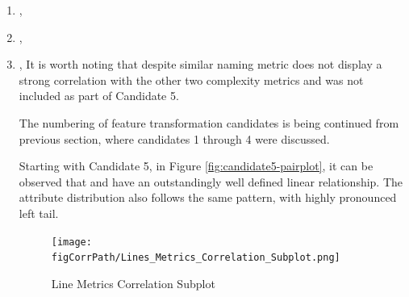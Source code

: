 \begin{enumerate}
\FloatBarrier
\textbf{In conclusion} all features investigated in this section have displayed high positive relationship with one another, very strong linear relationship as well as almost perfectly aligned data distribution. Therefore, only 4 of the 10 attributes, enumerated in section \ref{lst:code-coverage-candidates}, have been retained:

\begin{itemize}
    \item \overallBranchCoverage{}
    \item \overallUncoveredLines{}
    \item \overallCoverage{}
    \item \overallUncoveredConditions{}
\end{itemize}

\paragraph{Line and complexity features}\label{sec:impl-data-analysis:corr:line-and-complexity}
In the following section a number off attributes will be investigated with regards to the possibility of transforming said features and reducing dimensionality of the overall dataset. Given a sub plot of a heatmap presented in Figure \ref{fig:correlation-line-metrics-subplot} the attributes under analysis are, based on their high correlation:
    \item \complexity{}, \fileComplexity{}    \item \statements{}, \linesToCover{}
    \item \ncloc{}, \lines{}
It is worth noting that despite similar naming \functionComplexity{} metric does not display a strong correlation with the other two complexity metrics and was not included  as part of Candidate 5.

The numbering of feature transformation candidates is being continued from previous section, where candidates 1 through 4 were discussed.

Starting with Candidate 5, in Figure \ref{fig:candidate5-pairplot}, it can be observed that \complexity{} and \fileComplexity{} have an outstandingly well defined linear relationship. The attribute distribution also follows the same pattern, with highly pronounced left tail. 

\begin{figure}
    \centering
    \texttt{[image: \\figCorrPath/Lines\_Metrics\_Correlation\_Subplot.png]}
    \caption{Line Metrics Correlation Subplot}
    \label{fig:correlation-line-metrics-subplot}
\end{figure}


\end{enumerate}
